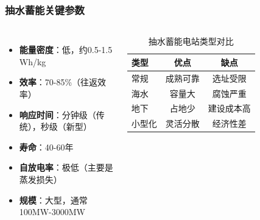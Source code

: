 \documentclass[aspectratio=169]{beamer}
\begin{document}
\begin{frame}
    \frametitle{抽水蓄能关键参数}
    \begin{columns}
        \begin{itemize}
            \item \textbf{能量密度}：低，约0.5-1.5 Wh/kg
            \item \textbf{效率}：70-85\%（往返效率）
            \item \textbf{响应时间}：分钟级（传统），秒级（新型）
            \item \textbf{寿命}：40-60年
            \item \textbf{自放电率}：极低（主要是蒸发损失）
            \item \textbf{规模}：大型，通常100MW-3000MW
        \end{itemize}
        
        \begin{table}[h]
            \centering
            \begin{tabular}{lcc}
                \toprule
                \textbf{类型} & \textbf{优点} & \textbf{缺点} \\
                \midrule
                常规 & 成熟可靠 & 选址受限 \\
                海水 & 容量大 & 腐蚀严重 \\
                地下 & 占地少 & 建设成本高 \\
                小型化 & 灵活分散 & 经济性差 \\
                \bottomrule
            \end{tabular}
            \caption{抽水蓄能电站类型对比}
        \end{table}
    \end{columns}
\end{frame}
\end{document}
